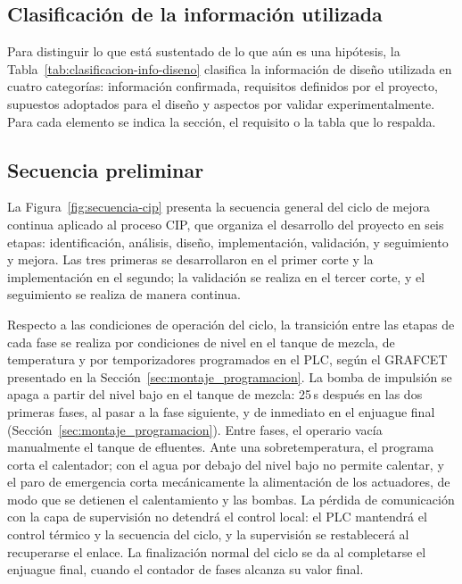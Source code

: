 \subsection{Clasificación de la información utilizada}
Para distinguir lo que está sustentado de lo que aún es una hipótesis, la Tabla~\ref{tab:clasificacion-info-diseno} clasifica la información de diseño utilizada en cuatro categorías: información confirmada, requisitos definidos por el proyecto, supuestos adoptados para el diseño y aspectos por validar experimentalmente. Para cada elemento se indica la sección, el requisito o la tabla que lo respalda.


\subsection{Secuencia preliminar}
La Figura~\ref{fig:secuencia-cip} presenta la secuencia general del ciclo de mejora continua aplicado al proceso CIP, que organiza el desarrollo del proyecto en seis etapas: identificación, análisis, diseño, implementación, validación, y seguimiento y mejora. Las tres primeras se desarrollaron en el primer corte y la implementación en el segundo; la validación se realiza en el tercer corte, y el seguimiento se realiza de manera continua.


{Respecto a las condiciones de operación del ciclo, la transición entre las etapas de cada fase se realiza por condiciones de nivel en el tanque de mezcla, de temperatura y por temporizadores programados en el PLC, según el GRAFCET presentado en la Sección~\ref{sec:montaje_programacion}. La bomba de impulsión se apaga a partir del nivel bajo en el tanque de mezcla: 25\,s después en las dos primeras fases, al pasar a la fase siguiente, y de inmediato en el enjuague final (Sección~\ref{sec:montaje_programacion}). Entre fases, el operario vacía manualmente el tanque de efluentes. Ante una sobretemperatura, el programa corta el calentador; con el agua por debajo del nivel bajo no permite calentar, y el paro de emergencia corta mecánicamente la alimentación de los actuadores, de modo que se detienen el calentamiento y las bombas. La pérdida de comunicación con la capa de supervisión no detendrá el control local: el PLC mantendrá el control térmico y la secuencia del ciclo, y la supervisión se restablecerá al recuperarse el enlace. La finalización normal del ciclo se da al completarse el enjuague final, cuando el contador de fases alcanza su valor final.}
